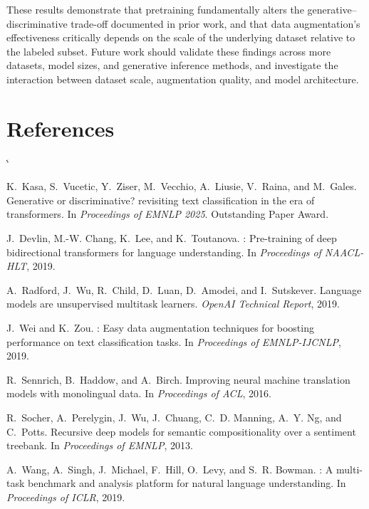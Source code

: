 \documentclass[11pt,a4paper,twocolumn]{article}
\makeatletter
\renewenvironment{thebibliography}[1]
  {\section*{References}%
   \list{\@biblabel{\@arabic\c@enumiv}}%
        {\settowidth\labelwidth{\@biblabel{#1}}%
         \leftmargin\labelwidth
         \advance\leftmargin\labelsep
         \@openbib@code
         \usecounter{enumiv}%
         \let\p@enumiv\@empty
         \renewcommand\theenumiv{\@arabic\c@enumiv}}%
   \sloppy
   \clubpenalty4000
   \@clubpenalty \clubpenalty
   \widowpenalty4000%
   \sfcode`\.\@m}
  {\def\@noitemerr{\@latex@warning{Empty `thebibliography' environment}}%
   \endlist}
\makeatother
\begin{document}
These results demonstrate that pretraining fundamentally alters the generative--discriminative trade-off documented in prior work, and that data augmentation's effectiveness critically depends on the scale of the underlying dataset relative to the labeled subset. Future work should validate these findings across more datasets, model sizes, and generative inference methods, and investigate the interaction between dataset scale, augmentation quality, and model architecture.

\begin{thebibliography}{15}

K.~Kasa, S.~Vucetic, Y.~Ziser, M.~Vecchio, A.~Liusie, V.~Raina, and M.~Gales.
\newblock Generative or discriminative? revisiting text classification in the
  era of transformers.
\newblock In \textit{Proceedings of EMNLP 2025}. Outstanding Paper Award.

J.~Devlin, M.-W. Chang, K.~Lee, and K.~Toutanova.
: Pre-training of deep bidirectional transformers for language
  understanding.
\newblock In \textit{Proceedings of NAACL-HLT}, 2019.

A.~Radford, J.~Wu, R.~Child, D.~Luan, D.~Amodei, and I.~Sutskever.
\newblock Language models are unsupervised multitask learners.
\newblock \textit{OpenAI Technical Report}, 2019.

J.~Wei and K.~Zou.
: Easy data augmentation techniques for boosting performance on
  text classification tasks.
\newblock In \textit{Proceedings of EMNLP-IJCNLP}, 2019.

R.~Sennrich, B.~Haddow, and A.~Birch.
\newblock Improving neural machine translation models with monolingual data.
\newblock In \textit{Proceedings of ACL}, 2016.

R.~Socher, A.~Perelygin, J.~Wu, J.~Chuang, C.~D. Manning, A.~Y. Ng, and C.~Potts.
\newblock Recursive deep models for semantic compositionality over a sentiment
  treebank.
\newblock In \textit{Proceedings of EMNLP}, 2013.

A.~Wang, A.~Singh, J.~Michael, F.~Hill, O.~Levy, and S.~R. Bowman.
: A multi-task benchmark and analysis platform for natural
  language understanding.
\newblock In \textit{Proceedings of ICLR}, 2019.


\end{thebibliography}
\end{document}
